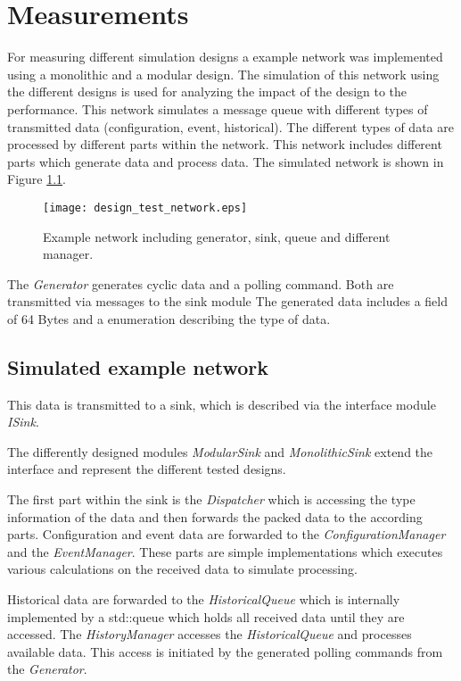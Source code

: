 \chapter{Measurements}
\label{cha:measurements}
For measuring different simulation designs a example network was implemented using a monolithic and a modular design.
The simulation of this network using the different designs is used for analyzing the impact of the design to the performance.
This network simulates a message queue with different types of transmitted data (configuration, event, historical).
The different types of data are processed by different parts within the network.
This network includes different parts which generate data and process data.
The simulated network is shown in Figure \ref{fig:design_test_network}.

\begin{figure}
    \centering
    \texttt{[image: design\_test\_network.eps]}
    \caption{Example network including generator, sink, queue and different manager.}
    \label{fig:design_test_network}
\end{figure}

The \emph{Generator} generates cyclic data and a polling command.
Both are transmitted via messages to the sink module
The generated data includes a field of 64 Bytes and a enumeration describing the type of data.

\section{Simulated example network}
\label{sec:measurements_network}
This data is transmitted to a sink, which is described via the interface module \emph{ISink}.

The differently designed modules \emph{ModularSink} and \emph{MonolithicSink} extend the interface and represent the different tested designs.

The first part within the sink is the \emph{Dispatcher} which is accessing the type information of the data and then forwards the packed data to the according parts.
Configuration and event data are forwarded to the \emph{ConfigurationManager} and the \emph{EventManager}.
These parts are simple implementations which executes various calculations on the received data to simulate processing.

Historical data are forwarded to the \emph{HistoricalQueue} which is internally implemented by a std::queue which holds all received data until they are accessed.
The \emph{HistoryManager} accesses the \emph{HistoricalQueue} and processes available data.
This access is initiated by the generated polling commands from the \emph{Generator}.
\\


